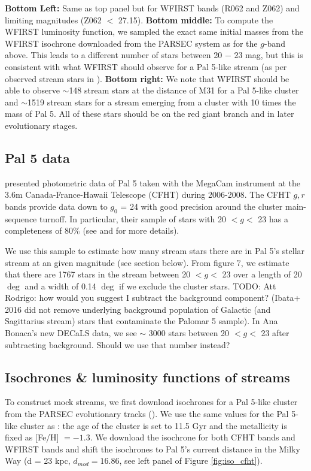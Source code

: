 \documentclass[twocolumn]{aastex62}
\newcommand{\todo}[1]{{\color{red} TODO: #1}}
\begin{document}
\begin{figure*}
{{\bf Bottom Left:} Same as top panel but for WFIRST bands (R062 and Z062) and limiting magnitudes (Z062 $<$ 27.15). {\bf Bottom middle:} To compute the WFIRST luminosity function, we sampled the exact same initial masses from the WFIRST isochrone downloaded from the PARSEC system as for the $g$-band above. This leads to a different number of stars between 20 $-$ 23 mag, but this is consistent with what WFIRST should observe for a Pal 5-like stream (as per observed stream stars in \citealt{ibata16}). {\bf Bottom right:} We note that WFIRST should be able to observe $\sim$148 stream stars at the distance of M31 for a Pal 5-like cluster and $\sim$1519 stream stars for a stream emerging from a cluster with 10 times the mass of Pal 5. All of these stars should be on the red giant branch and in later evolutionary stages.}
\label{fig:iso_cfht}
\end{figure*}



\subsection{Pal 5 data}
\label{sec:pal5}
 \citet{ibata16} presented photometric data of Pal 5 taken with the MegaCam instrument at the 3.6m Canada-France-Hawaii Telescope (CFHT) during 2006-2008. The CFHT $g, r$ bands provide data down to $g_0$ = 24 with good precision around the cluster main-sequence turnoff. In particular, their sample of stars with 20 $< g <$ 23 has a completeness of 80\% (see \citealt{ibata16} and \citealt{ibata17} for more details). 
 
We use this sample to estimate how many stream stars there are in Pal 5's stellar stream at an given magnitude (see section below). From \citet{ibata16} figure 7, we estimate that there are 1767 stars in the stream between 20 $< g <$ 23 over a length of 20 $\deg$  and a width of 0.14 $\deg$ if we exclude the cluster stars. \todo{Att Rodrigo: how would you suggest I subtract the background component? (Ibata+ 2016 did not remove underlying background population of Galactic (and Sagittarius stream) stars that contaminate the Palomar 5 sample). In Ana Bonaca's new DECaLS data, we see $\sim$ 3000 stars between 20 $< g <$ 23 after subtracting background. Should we use that number instead? }  

\subsection{Isochrones \& luminosity functions of streams}
\label{sec:lum}
To construct mock streams, we first download isochrones for a Pal 5-like cluster from the PARSEC evolutionary tracks (\citealt{bressan12}). We use the same values for the Pal 5-like cluster as \citet{ibata17}: the age of the cluster is set to 11.5 Gyr and the metallicity is fixed as [Fe/H] $= -1.3$. We download the isochrone for both CFHT bands and WFIRST bands and shift the isochrones to Pal 5's current distance in the Milky Way (d = 23 kpc, $d_{mod} = 16.86$, see left panel of Figure \ref{fig:iso_cfht}). 
\end{document}
